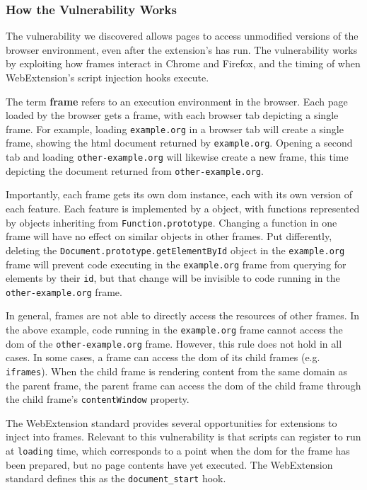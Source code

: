\subsubsection{How the Vulnerability Works}
The vulnerability we discovered allows pages to access unmodified versions
of the browser environment, even after the extension's \JS has run.  The
vulnerability works by exploiting how frames interact in Chrome and Firefox,
and the timing of when WebExtension's script injection hooks execute.


The term \textbf{frame} refers to an execution environment in the browser.
Each page loaded by the browser gets a frame, with each browser
tab depicting a single frame.  For example, loading \texttt{example.org} in
a browser tab will create a single frame, showing the \gls{html} document
returned by \texttt{example.org}.  Opening a second tab and loading
\texttt{other-example.org} will likewise create a new frame, this time
depicting the document returned from \texttt{other-example.org}.

Importantly, each frame gets its own \gls{dom} instance, each with its own
version of each \WAPI feature.  Each \WAPI feature is implemented by a \JS
object, with functions represented by objects inheriting from
\texttt{Function.prototype}.  Changing a function in one frame will have no
effect on similar objects in other frames.  Put differently, deleting the
\texttt{Document.prototype.getElementById} object in the \texttt{example.org}
frame will prevent code executing in the \texttt{example.org} frame from
querying for elements by their \texttt{id}, but that change will be invisible
to code running in the \texttt{other-example.org} frame.

In general, frames are not able to directly access the resources of other
frames.  In the above example, code running in the \texttt{example.org} frame
cannot access the \gls{dom} of the \texttt{other-example.org} frame.  However,
this rule does not hold in all cases.  In some cases, a frame can access the
\gls{dom} of its child frames (e.g. \texttt{iframes}).  When the child frame is
rendering content from the same domain as the parent frame, the parent frame
can access the \gls{dom} of the child frame through the child frame's
\texttt{contentWindow} property.


The WebExtension standard provides several opportunities for extensions to
inject \JS into frames.  Relevant to this vulnerability is that scripts can
register to run at \texttt{loading} time, which corresponds to a point when
the \gls{dom} for the frame has been prepared, but no page contents have
yet executed. The WebExtension standard defines this as the
\texttt{document\_start} hook.

